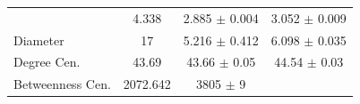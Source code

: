 \documentclass[12pt,twoside]{amherstthesis}
\begin{document}
\begin{longtable}[]{@{}lccc@{}}
\begin{minipage}[t]{0.20\columnwidth}
  \end{minipage} & \begin{minipage}[t]{0.12\columnwidth}\centering\strut
  4.338\strut
  \end{minipage} & \begin{minipage}[t]{0.27\columnwidth}\centering\strut
  2.885 \(\pm\) 0.004\strut
  \end{minipage} & \begin{minipage}[t]{0.29\columnwidth}\centering\strut
  3.052 \(\pm\) 0.009\strut
  \end{minipage}\tabularnewline
  \begin{minipage}[t]{0.20\columnwidth}\raggedright\strut
  Diameter\strut
  \end{minipage} & \begin{minipage}[t]{0.12\columnwidth}\centering\strut
  17\strut
  \end{minipage} & \begin{minipage}[t]{0.27\columnwidth}\centering\strut
  5.216 \(\pm\) 0.412\strut
  \end{minipage} & \begin{minipage}[t]{0.29\columnwidth}\centering\strut
  6.098 \(\pm\) 0.035\strut
  \end{minipage}\tabularnewline
  \begin{minipage}[t]{0.20\columnwidth}\raggedright\strut
  Degree Cen.\strut
  \end{minipage} & \begin{minipage}[t]{0.12\columnwidth}\centering\strut
  43.69\strut
  \end{minipage} & \begin{minipage}[t]{0.27\columnwidth}\centering\strut
  43.66 \(\pm\) 0.05\strut
  \end{minipage} & \begin{minipage}[t]{0.29\columnwidth}\centering\strut
  44.54 \(\pm\) 0.03\strut
  \end{minipage}\tabularnewline
  \begin{minipage}[t]{0.20\columnwidth}\raggedright\strut
  Betweenness Cen.\strut
  \end{minipage} & \begin{minipage}[t]{0.12\columnwidth}\centering\strut
  2072.642\strut
  \end{minipage} & \begin{minipage}[t]{0.27\columnwidth}\centering\strut
  3805 \(\pm\) 9\strut
  \end{minipage} & \begin{minipage}[t]{0.29\columnwidth}\centering\strut

\end{minipage}
\end{longtable}
\end{document}
